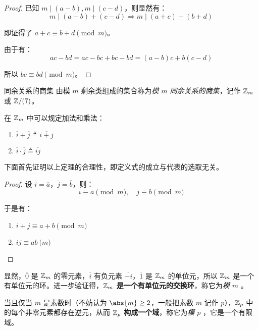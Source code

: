 \begin{proof}
	已知 $m \mid (a - b), m \mid (c - d)$，则显然有：
	$$
	m \mid (a - b) + (c - d) \Longrightarrow m \mid (a + c) - (b + d)
	$$

	即证得了 $a + c \equiv b + d \pmod{m}$。

	由于有：
	$$
	ac - bd = ac - bc + bc - bd = (a - b) c + b (c - d)
	$$

	所以 $bc \equiv bd \pmod{m}$。
\end{proof}

\begin{definition}{同余关系的商集}
	由模 $m$ 剩余类组成的集合称为\emph{模 $m$ 同余关系的商集}，记作 $\mathbb Z_m$ 或 $\mathbb Z / (7)$。
\end{definition}

在 $\mathbb Z_m$ 中可以规定加法和乘法：
\begin{enumerate}
	\item $\overline i + \overline j \triangleq \overline{i + j}$
	\item $\overline i \cdot \overline j \triangleq \overline {ij}$
\end{enumerate}

下面首先证明以上定理的合理性，即定义式的成立与代表的选取无关。

\begin{proof}
	设 $\overline i = \overline a$，$\overline j = \overline b$，则：
	$$
	i \equiv a \pmod{m}, \quad j \equiv b \pmod{m}
	$$

	于是有：
	\begin{enumerate}
		\item $i + j \equiv a + b \pmod{m}$
		\item $ij \equiv ab \pod{m}$
	\end{enumerate}
\end{proof}

显然，$\overline 0$ 是 $\mathbb Z_m$ 的零元素，$\overline i$ 有负元素 $\overline{-i}$，$\overline 1$ 是 $\mathbb Z_m$ 的单位元，所以 $\mathbb Z_m$ 是一个有单位元的环。进一步验证得，\textbf{$\mathbb Z_m$ 是一个有单位元的交换环}，称它为\emph{模 $m$ }。

当且仅当 $m$ 是素数时（不妨认为 $\abs{m} \ge 2$，一般把素数 $m$ 记作 $p$），$\mathbb Z_p$ 中的每个非零元素都存在逆元，从而 \textbf{$\mathbb Z_p$ 构成一个域}，称它为\emph{模 $p$ }，它是一个有限域。

